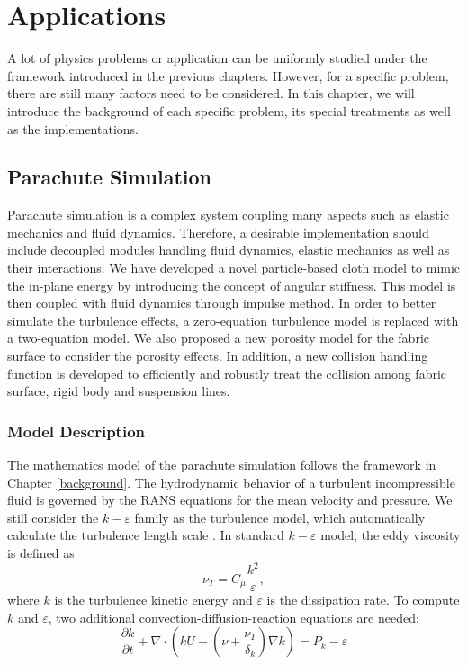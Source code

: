 \chapter{Applications}
A lot of physics problems or application can be uniformly studied under the framework introduced in the previous chapters. However, for a specific problem, there are still many factors need to be considered. In this chapter, we will introduce the background of each specific problem, its special treatments as well as the implementations.
\section{Parachute Simulation}
Parachute simulation is a complex system coupling many aspects such as 
elastic mechanics and fluid dynamics. Therefore, a desirable implementation should include decoupled modules handling fluid dynamics, elastic mechanics as well as their interactions. We have developed a novel particle-based cloth model to mimic the in-plane energy by introducing the concept of angular stiffness. This model is then coupled with fluid dynamics through impulse method. In order to better simulate the turbulence effects, a zero-equation turbulence model is replaced with a two-equation model. We also proposed a new 
porosity model for the fabric surface to consider the porosity effects. 
In addition, a new collision handling function is developed to efficiently and 
robustly treat the collision among fabric surface, rigid body and suspension lines.

\subsection{Model Description}
The mathematics model of the parachute simulation follows the framework in Chapter \ref{background}. The hydrodynamic behavior of a turbulent incompressible fluid is governed by the RANS equations for the mean velocity and pressure. We still consider the $k-\varepsilon$ family as the turbulence model, which automatically
calculate the turbulence length scale \cite{wilcox1998turbulence}.  In standard
$k-\varepsilon$ model, the eddy viscosity is defined as 
\begin{equation} \nu_T =
C_{\mu}\frac{k^2}{\varepsilon}, \label{eq:nuT} 
\end{equation} 
where $k$ is the turbulence kinetic energy and $\varepsilon$ is the dissipation rate. To compute $k$ and $\varepsilon$, two additional convection-diffusion-reaction equations
are needed: 
\begin{equation} 
\frac{\partial k}{\partial
t}+\nabla\cdot(kU-(\nu+\frac{\nu_T}{\delta_k})\nabla k) =P_k - \varepsilon
\label{eq:k} 
\end{equation} 


